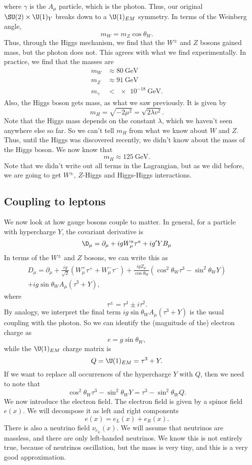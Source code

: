 \documentclass[a4paper]{article}
\begin{document}
where $\gamma$ is the $A_\mu$ particle, which is the photon. Thus, our original $\SU(2) \times \U(1)_Y$ breaks down to a $\U(1)_{EM}$ symmetry. In terms of the Weinberg angle,
\[
  m_W = m_Z \cos \theta_W.
\]
Thus, through the Higgs mechanism, we find that the $W^{\pm}$ and $Z$ bosons gained mass, but the photon does not. This agrees with what we find experimentally. In practice, we find that the masses are
\begin{align*}
  m_W &\approx \SI{80}{\giga\electronvolt}\\
  m_Z &\approx \SI{91}{\giga\electronvolt}\\
  m_\gamma &< \SI{e-18}{\giga\electronvolt}.
\end{align*}
Also, the Higgs boson gets mass, as what we saw previously. It is given by
\[
  m_H = \sqrt{-2 \mu^2} = \sqrt{2 \lambda v^2}.
\]
Note that the Higgs mass depends on the constant $\lambda$, which we haven't seen anywhere else so far. So we can't tell $m_H$ from what we know about $W$ and $Z$. Thus, until the Higgs was discovered recently, we didn't know about the mass of the Higgs boson. We now know that
\[
  m_H \approx \SI{125}{\giga\electronvolt}.
\]
Note that we didn't write out all terms in the Lagrangian, but as we did before, we are going to get $W^{\pm}$, $Z$-Higgs and Higgs-Higgs interactions.

\subsection{Coupling to leptons}
We now look at how gauge bosons couple to matter. In general, for a particle with hypercharge $Y$, the covariant derivative is
\[
  \D_\mu = \partial_\mu + i g W_\mu^a \tau^a + i g' Y B_\mu
\]
In terms of the $W^{\pm}$ and $Z$ bosons, we can write this as
\begin{multline*}
  D_\mu = \partial_\mu + \frac{ig}{\sqrt{2}} (W_\mu^+ \tau^+ + W_\mu^- \tau^-) + \frac{ig Z_\mu}{\cos \theta_W} (\cos^2 \theta_W \tau^3 - \sin^2 \theta_W Y) \\
  + ig \sin \theta_W A_\mu (\tau^3 + Y),
\end{multline*}
where
\[
  \tau^{\pm} = \tau^1 \pm i \tau^2.
\]
By analogy, we interpret the final term $ig \sin \theta_W A_\mu (\tau^3 + Y)$ is the usual coupling with the photon. So we can identify the (magnitude of the) electron charge as
\[
  e = g \sin \theta_W,
\]
while the $\U(1)_{EM}$ charge matrix is
\[
  Q = \U(1)_{EM} = \tau^3 + Y.
\]
If we want to replace all occurrences of the hypercharge $Y$ with $Q$, then we need to note that
\[
  \cos^2 \theta_W \tau^3 - \sin^2 \theta_W Y = \tau^3 - \sin^2 \theta_W Q.
\]
We now introduce the electron field. The electron field is given by a spinor field $e(x)$. We will decompose it as left and right components
\[
  e(x) = e_L(x) + e_R(x).
\]
There is also a neutrino field $\nu_{e_L}(x)$. We will assume that neutrinos are massless, and there are only left-handed neutrinos. We know this is not entirely true, because of neutrinos oscillation, but the mass is very tiny, and this is a very good approximation.
\end{document}
